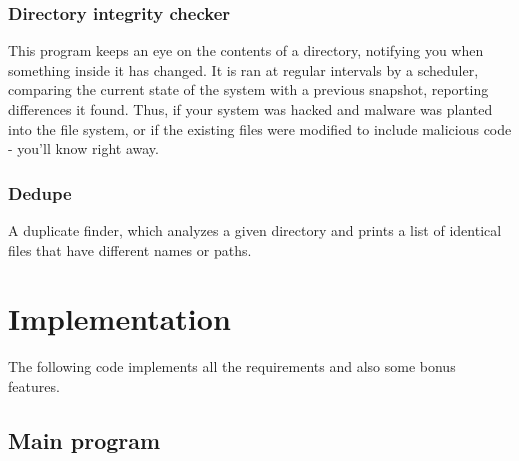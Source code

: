 \documentclass{article}
\begin{document}
  \subsubsection{Directory integrity checker}

	This program keeps an eye on the contents of a directory, notifying you when something inside it has changed.
   It is ran at regular intervals by a scheduler, comparing the current state of the system with a previous snapshot, reporting differences it found.
  Thus, if your system was hacked and malware was planted into the file system, or if the existing files
   were modified to include malicious code - you'll know right away.

  \subsubsection{Dedupe}

A duplicate finder, which analyzes a given directory and prints a list of identical files that have different names or paths.



  \section{Implementation}

  The following code implements all the requirements and also some bonus features.

  \subsection{Main program}
\end{document}
